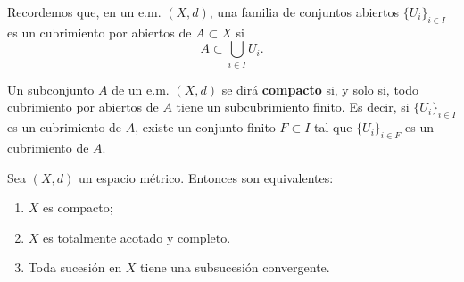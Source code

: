 Recordemos que, en un e.m. $(X,d)$, una familia de conjuntos
abiertos $\{U_i\}_{i\in I}$ es un cubrimiento por abiertos de
$A\subset X$ si
\[
	A\subset\bigcup\limits_{i\in I}U_i.
\]
\begin{definicion}{} Un subconjunto $A$ de un e.m. $(X,d)$ se dirá
\textbf{compacto} si, y solo si, todo cubrimiento por abiertos de
$A$ tiene un subcubrimiento finito. Es decir, si $\{U_i\}_{i\in
I}$ es un cubrimiento  de $A$, existe un conjunto finito $F\subset
I$ tal que $\{U_i\}_{i\in F}$ es un cubrimiento de $A$.
\end{definicion}

\begin{teorema}{}
 Sea $(X,d)$ un  espacio métrico. Entonces son
equivalentes:

\begin{enumerate}
\item\label{inc,compacto} $X$ es compacto;
\item\label{inc,toacotadoycomp} $X$ es totalmente acotado y
completo.
\item\label{inc,subs} Toda sucesión en $X$ tiene una subsucesión
convergente.
\end{enumerate}
\end{teorema}
